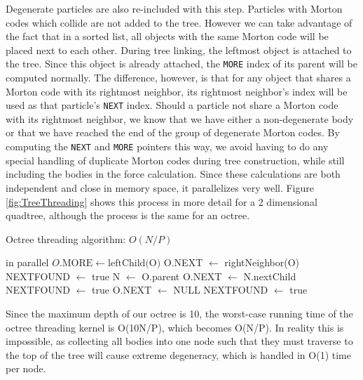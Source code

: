 \documentclass{thesis}
\begin{document}
Degenerate particles are also re-included with this step. Particles with  Morton codes which collide are not added to the tree. However we can take advantage of the fact that in a sorted list, all objects with the same  Morton code will be placed next to each other. During tree linking, the leftmost object is attached to the tree. Since this object is already attached, the \texttt{MORE} index of its parent will be computed normally. The difference, however, is that for any object that shares a Morton code with its rightmost neighbor, its rightmost neighbor's index will be used as that particle's \texttt{NEXT} index. Should a particle not share a  Morton code with its rightmost neighbor, we know that we have either a non-degenerate body or that we have reached the end of the group of degenerate  Morton codes. By computing the \texttt{NEXT} and \texttt{MORE} pointers this way, we avoid having to do any special handling of duplicate  Morton codes during tree construction, while still including the bodies in the force calculation. Since these calculations are both independent and close in memory space, it parallelizes very well. Figure \ref{fig:TreeThreading} shows this process in more detail for a 2 dimensional quadtree, although the process is the same for an octree.

\begin{algorithm}
    \label{alg:OctreeThreading}
    \caption{Octree threading algorithm: $O(N/P)$}
    \begin{algorithmic}
         in parallel
            \State $O.\text{MORE} \gets \text{leftChild(O)}$
                \State O.NEXT $\gets$ rightNeighbor(O)
                \State NEXTFOUND $\gets$ true
            \EndIf
                \State N $\gets$ O.parent
                    \State O.NEXT $\gets$ N.nextChild
                    \State NEXTFOUND $\gets$ true
                    \State O.NEXT $\gets$ NULL
                    \State NEXTFOUND $\gets$ true
                \EndIf
            \EndWhile
        \EndFor
    \end{algorithmic}
\end{algorithm}
Since the maximum depth of our octree is 10, the worst-case running time of the octree threading kernel is O(10N/P), which becomes O(N/P). In reality this is impossible, as collecting all bodies into one node such that they must traverse to the top of the tree will cause extreme degeneracy, which is handled in O(1) time per node.
\end{document}
